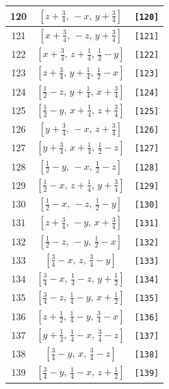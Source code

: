 \documentclass[fleqn,8pt]{jsarticle}
\begin{document}
\begin{longtable}{ccc}
120 & $\left[ z + \frac{3}{4},\, - x,\, y + \frac{3}{4} \right]$ & {\tt [120]} \\ \hline
121 & $\left[ x + \frac{3}{4},\, - z,\, y + \frac{3}{4} \right]$ & {\tt [121]} \\ \hline
122 & $\left[ x + \frac{3}{4},\, z + \frac{1}{4},\, \frac{1}{2} - y \right]$ & {\tt [122]} \\ \hline
123 & $\left[ z + \frac{3}{4},\, y + \frac{1}{4},\, \frac{1}{2} - x \right]$ & {\tt [123]} \\ \hline
124 & $\left[ \frac{1}{2} - z,\, y + \frac{1}{4},\, x + \frac{3}{4} \right]$ & {\tt [124]} \\ \hline
125 & $\left[ \frac{1}{2} - y,\, x + \frac{1}{4},\, z + \frac{3}{4} \right]$ & {\tt [125]} \\ \hline
126 & $\left[ y + \frac{3}{4},\, - x,\, z + \frac{3}{4} \right]$ & {\tt [126]} \\ \hline
127 & $\left[ y + \frac{3}{4},\, x + \frac{1}{4},\, \frac{1}{2} - z \right]$ & {\tt [127]} \\ \hline
128 & $\left[ \frac{1}{2} - y,\, - x,\, \frac{1}{2} - z \right]$ & {\tt [128]} \\ \hline
129 & $\left[ \frac{1}{2} - x,\, z + \frac{1}{4},\, y + \frac{3}{4} \right]$ & {\tt [129]} \\ \hline
130 & $\left[ \frac{1}{2} - x,\, - z,\, \frac{1}{2} - y \right]$ & {\tt [130]} \\ \hline
131 & $\left[ z + \frac{3}{4},\, - y,\, x + \frac{3}{4} \right]$ & {\tt [131]} \\ \hline
132 & $\left[ \frac{1}{2} - z,\, - y,\, \frac{1}{2} - x \right]$ & {\tt [132]} \\ \hline
133 & $\left[ \frac{3}{4} - x,\, z,\, \frac{3}{4} - y \right]$ & {\tt [133]} \\ \hline
134 & $\left[ \frac{3}{4} - x,\, \frac{1}{4} - z,\, y + \frac{1}{2} \right]$ & {\tt [134]} \\ \hline
135 & $\left[ \frac{3}{4} - z,\, \frac{1}{4} - y,\, x + \frac{1}{2} \right]$ & {\tt [135]} \\ \hline
136 & $\left[ z + \frac{1}{2},\, \frac{1}{4} - y,\, \frac{3}{4} - x \right]$ & {\tt [136]} \\ \hline
137 & $\left[ y + \frac{1}{2},\, \frac{1}{4} - x,\, \frac{3}{4} - z \right]$ & {\tt [137]} \\ \hline
138 & $\left[ \frac{3}{4} - y,\, x,\, \frac{3}{4} - z \right]$ & {\tt [138]} \\ \hline
139 & $\left[ \frac{3}{4} - y,\, \frac{1}{4} - x,\, z + \frac{1}{2} \right]$ & {\tt [139]} \\ \hline

\end{longtable}
\end{document}
